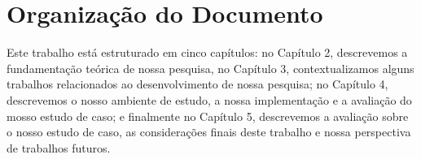 \section{Organização do Documento}
\label{organization}
%


Este trabalho está estruturado em cinco capítulos: no Capítulo 2, descrevemos a fundamentação teórica de nossa pesquisa, no Capítulo 3, contextualizamos alguns trabalhos relacionados ao desenvolvimento de nossa pesquisa; no Capítulo 4, descrevemos o nosso ambiente de estudo, a nossa implementação e a avaliação do mosso estudo de caso; e finalmente no Capítulo 5, descrevemos a avaliação sobre o nosso estudo de caso, as considerações finais deste trabalho e nossa perspectiva de trabalhos futuros.






